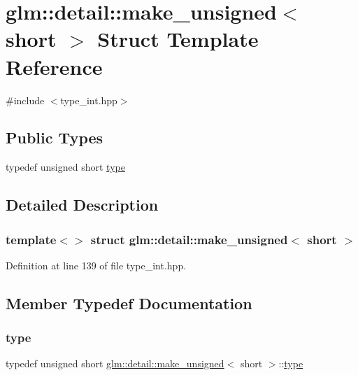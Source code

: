 \hypertarget{structglm_1_1detail_1_1make__unsigned_3_01short_01_4}{}\section{glm\+::detail\+::make\+\_\+unsigned$<$ short $>$ Struct Template Reference}
\label{structglm_1_1detail_1_1make__unsigned_3_01short_01_4}


{\ttfamily \#include $<$type\+\_\+int.\+hpp$>$}

\subsection*{Public Types}
\begin{DoxyCompactItemize}
\item 
typedef unsigned short \mbox{\hyperlink{structglm_1_1detail_1_1make__unsigned_3_01short_01_4_a58861091aca3a68acc085131cc6fefa4}{type}}
\end{DoxyCompactItemize}


\subsection{Detailed Description}
\subsubsection*{template$<$$>$\newline
struct glm\+::detail\+::make\+\_\+unsigned$<$ short $>$}



Definition at line 139 of file type\+\_\+int.\+hpp.



\subsection{Member Typedef Documentation}
\mbox{\label{structglm_1_1detail_1_1make__unsigned_3_01short_01_4_a58861091aca3a68acc085131cc6fefa4}} 
\subsubsection{\texorpdfstring{type}{type}}
{\footnotesize\ttfamily typedef unsigned short \mbox{\hyperlink{structglm_1_1detail_1_1make__unsigned}{glm\+::detail\+::make\+\_\+unsigned}}$<$ short $>$\+::\mbox{\hyperlink{structglm_1_1detail_1_1make__unsigned_3_01short_01_4_a58861091aca3a68acc085131cc6fefa4}{type}}}



